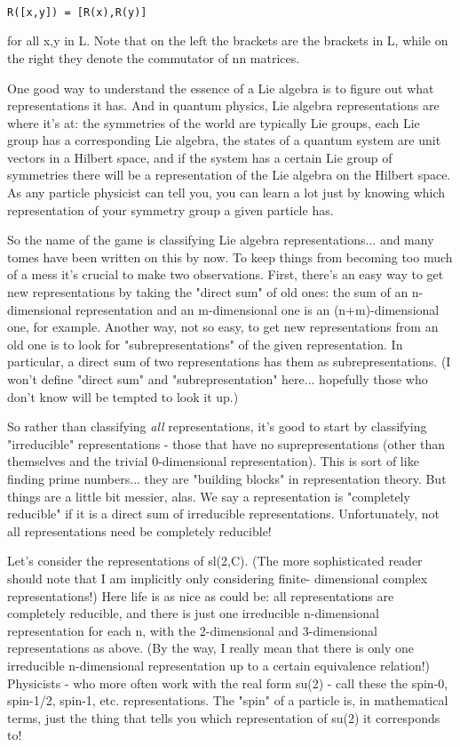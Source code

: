 \begin{verbatim}

R([x,y]) = [R(x),R(y)]
\end{verbatim}
    

for all x,y in L.  Note that on the left the brackets are the brackets
in L, while on the right they denote the commutator of n\times n matrices.  

One good way to understand the essence of a Lie algebra is to figure out
what representations it has.  And in quantum physics, Lie algebra
representations are where it's at: the symmetries of the world are
typically Lie groups, each Lie group has a corresponding Lie algebra,
the states of a quantum system are unit vectors in a Hilbert space, and
if the system has a certain Lie group of symmetries there will be a
representation of the Lie algebra on the Hilbert space.  As any particle
physicist can tell you, you can learn a lot just by knowing which
representation of your symmetry group a given particle has.

So the name of the game is classifying Lie algebra representations...
and many tomes have been written on this by now.  To keep things from
becoming too much of a mess it's crucial to make two observations.
First, there's an easy way to get new representations by taking the
"direct sum" of old ones: the sum of an n-dimensional representation and
an m-dimensional one is an (n+m)-dimensional one, for example.  Another
way, not so easy, to get new representations from an old one is to look for
"subrepresentations" of the given representation.  In particular, a
direct sum of two representations has them as subrepresentations.  
(I won't define "direct sum" and "subrepresentation" here... hopefully
those who don't know will be tempted to look it up.)

So rather than classifying \emph{all} representations, it's good to start by
classifying "irreducible" representations - those that have no
suprepresentations (other than themselves and the trivial 0-dimensional
representation).  This is sort of like finding prime numbers... they are
"building blocks" in representation theory.  But things are a little bit
messier, alas.  We say a representation is "completely reducible" if it
is a direct sum of irreducible representations.  Unfortunately, not all
representations need be completely reducible!  

Let's consider the representations of sl(2,C).  (The more sophisticated
reader should note that I am implicitly only considering finite-
dimensional complex representations!)   Here life is as nice as could
be: all representations are completely reducible, and
there is just one irreducible n-dimensional representation for each
n, with the 2-dimensional and 3-dimensional representations as above.  
(By the way, I really mean that there is only one irreducible
n-dimensional representation up to a certain equivalence relation!) 
Physicists - who more often work with the real form su(2) - call these
the spin-0, spin-1/2, spin-1, etc. representations.  The "spin" of a
particle is, in mathematical terms, just the thing that tells you which
representation of su(2) it corresponds to!

